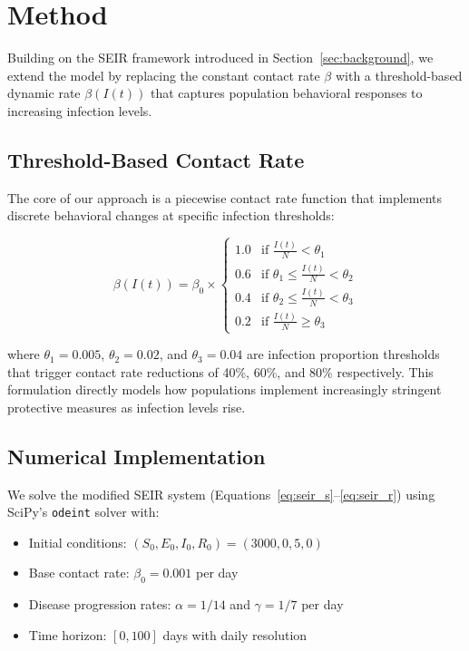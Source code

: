 \documentclass{article} %
\begin{document}
\section{Method}
\label{sec:method}

Building on the SEIR framework introduced in Section~\ref{sec:background}, we extend the model by replacing the constant contact rate $\beta$ with a threshold-based dynamic rate $\beta(I(t))$ that captures population behavioral responses to increasing infection levels.

\subsection{Threshold-Based Contact Rate}
The core of our approach is a piecewise contact rate function that implements discrete behavioral changes at specific infection thresholds:

\begin{equation}
\beta(I(t)) = \beta_0 \times
\begin{cases}
1.0 & \text{if } \frac{I(t)}{N} < \theta_1 \\
0.6 & \text{if } \theta_1 \leq \frac{I(t)}{N} < \theta_2 \\
0.4 & \text{if } \theta_2 \leq \frac{I(t)}{N} < \theta_3 \\
0.2 & \text{if } \frac{I(t)}{N} \geq \theta_3
\end{cases}
\label{eq:beta}
\end{equation}

where $\theta_1 = 0.005$, $\theta_2 = 0.02$, and $\theta_3 = 0.04$ are infection proportion thresholds that trigger contact rate reductions of 40\%, 60\%, and 80\% respectively. This formulation directly models how populations implement increasingly stringent protective measures as infection levels rise.

\subsection{Numerical Implementation}
We solve the modified SEIR system (Equations~\ref{eq:seir_s}--\ref{eq:seir_r}) using SciPy's {\tt odeint} solver with:
\begin{itemize}
    \item Initial conditions: $(S_0, E_0, I_0, R_0) = (3000, 0, 5, 0)$
    \item Base contact rate: $\beta_0 = 0.001$ per day
    \item Disease progression rates: $\alpha = 1/14$ and $\gamma = 1/7$ per day
    \item Time horizon: $[0, 100]$ days with daily resolution
\end{itemize}
\end{document}

